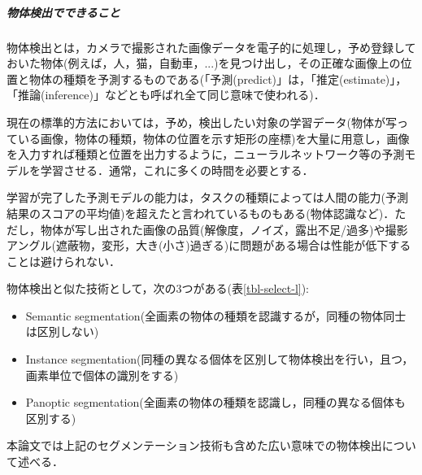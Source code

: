 \documentclass[twocolumn]{jsarticle} %
\begin{document}
\subparagraph{物体検出でできること} 物体検出とは，カメラで撮影された画像データを電子的に処理し，予め登録しておいた物体(例えば，人，猫，自動車，...)を見つけ出し，その正確な画像上の位置と物体の種類を予測するものである(「予測(predict)」は，「推定(estimate)」，「推論(inference)」などとも呼ばれ全て同じ意味で使われる)．

現在の標準的方法においては，予め，検出したい対象の学習データ(物体が写っている画像，物体の種類，物体の位置を示す矩形の座標)を大量に用意し，画像を入力すれば種類と位置を出力するように，ニューラルネットワーク等の予測モデルを学習させる．通常，これに多くの時間を必要とする．

学習が完了した予測モデルの能力は，タスクの種類によっては人間の能力(予測結果のスコアの平均値)を超えたと言われているものもある(物体認識など)．ただし，物体が写し出された画像の品質(解像度，ノイズ，露出不足/過多)や撮影アングル(遮蔽物，変形，大き(小さ)過ぎる)に問題がある場合は性能が低下することは避けられない．

物体検出と似た技術として，次の3つがある(表\ref{tbl-select-l}):

\begin{itemize}
    \item Semantic segmentation(全画素の物体の種類を認識するが，同種の物体同士は区別しない)
    \item Instance segmentation(同種の異なる個体を区別して物体検出を行い，且つ，画素単位で個体の識別をする)
    \item Panoptic segmentation(全画素の物体の種類を認識し，同種の異なる個体も区別する)
\end{itemize}
本論文では上記のセグメンテーション技術も含めた広い意味での物体検出について述べる．
\end{document}

